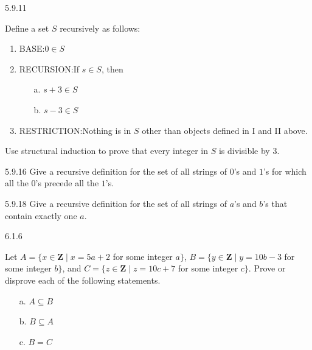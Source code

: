 \documentclass[11pt]{article}
\begin{document}
\begin{question}
    {5.9.11}
    {
        Define a set $S$ recursively as follows:
        \vspace{-\baselineskip}
        \begin{enumerate}[label=\Roman*.]
            \item BASE:\@ $0 \in S$
            \item RECURSION:\@ If $s \in S$, then
                \begin{enumerate}
                    \item[a.] $s + 3 \in S$
                    \item[b.] $s - 3 \in S$
                \end{enumerate}
            \item RESTRICTION:\@ Nothing is in $S$ other than objects defined in I and II above.
        \end{enumerate}
        \vspace{-\baselineskip}
        Use structural induction to prove that every integer in $S$ is divisible by $3$.
    }
\end{question}

\begin{question}
    {5.9.16}
    {
        Give a recursive definition for the set of all strings of $0$'s and $1$'s for which all the $0$'s precede all the $1$'s.
    }
\end{question}

\begin{question}
    {5.9.18}
    {
        Give a recursive definition for the set of all strings of $a$'s and $b$'s that contain exactly one $a$.
    }
\end{question}

\begin{question}
    {6.1.6}
    {
        Let $A=\{x \in \mathbf{Z} \mid x=5 a+2$ for some integer $a\}$, $B=\{y \in \mathbf{Z} \mid y=10 b-3$ for some integer $b\}$, and $C=\{z \in \mathbf{Z} \mid z=10 c+7$ for some integer $c\}$. Prove or disprove each of the following statements.
        \vspace{-\baselineskip}
        \begin{enumerate}
            \item[a.] $A \subseteq B$
            \item[b.] $B \subseteq A$
            \item[c.] $B=C$
        \end{enumerate}
    }
\end{question}
\end{document}
